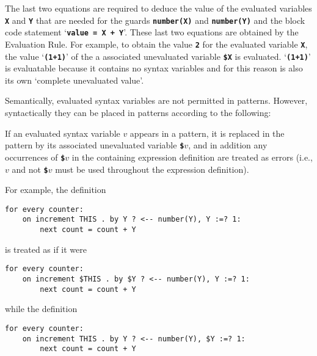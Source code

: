 \documentclass[12pt]{article}
\newcommand{\TT}[1]{{\tt \bfseries #1}}
\newcommand{\ikey}[2]{{\bf \em #1}\index{#2}}
\newenvironment{indpar}[1][0.3in]%
	{\begin{list}{}%
		     {\setlength{\itemsep}{0in}%
		      \setlength{\topsep}{0in}%
		      \setlength{\parsep}{1ex}%
		      \setlength{\labelwidth}{#1}%
		      \setlength{\leftmargin}{#1}%
		      \addtolength{\leftmargin}{\labelsep}}%
	 \item}%
	{\end{list}}
\begin{document}
The last two equations are required to deduce the value of the evaluated
variables \TT{X} and \TT{Y} that are needed for the guards
\TT{number(X)} and \TT{number(Y)} and the block code statement
`\TT{value = X + Y}'.  These last two equations are obtained by
the Evaluation Rule.  For example, to obtain the value \TT{2} for the
evaluated variable \TT{X}, the value `\TT{(1+1)}' of the a associated
unevaluated variable \TT{\$X} is evaluated.  `\TT{(1+1)}' is
evaluatable because it contains no syntax variables and for this reason is
also its own `complete unevaluated value'.

Semantically, evaluated syntax variables are not permitted in patterns.
However, syntactically they can be placed in patterns according to the
following:

\begin{indpar}
\begin{list}{}{}
\item [\ikey{Evaluated Variable Pattern Rule}%
{evaluated variable!pattern rule}:]%
\label{EVALUATED-VARIABLE-PROMOTION-RULE}
If an evaluated syntax variable $v$ appears in a pattern, it is 
replaced in the pattern by its associated unevaluated variable
\TT{\$}$v$, and in addition
any occurrences of \TT{\$}$v$ in the containing expression definition
are treated as errors (i.e., $v$ and not \TT{\$}$v$ must be used
throughout the expression definition).
\end{list}
\end{indpar}

For example, the definition

\begin{indpar}\begin{verbatim}
for every counter:
    on increment THIS . by Y ? <-- number(Y), Y :=? 1:
        next count = count + Y
\end{verbatim}\end{indpar}

is treated as if it were

\begin{indpar}\begin{verbatim}
for every counter:
    on increment $THIS . by $Y ? <-- number(Y), Y :=? 1:
        next count = count + Y
\end{verbatim}\end{indpar}

while the definition

\begin{indpar}\begin{verbatim}
for every counter:
    on increment THIS . by Y ? <-- number(Y), $Y :=? 1:
        next count = count + Y
\end{verbatim}\end{indpar}
\end{document}
